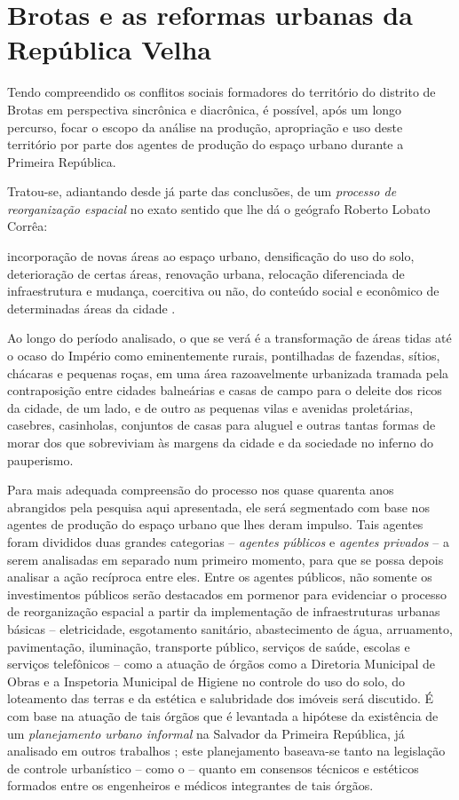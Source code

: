 \chapter{Brotas e as reformas urbanas da República Velha}\label{cap:3}

Tendo compreendido os conflitos sociais formadores do território do distrito de Brotas em perspectiva sincrônica e diacrônica, é possível, após um longo percurso, focar o escopo da análise na produção, apropriação e uso deste território por parte dos agentes de produção do espaço urbano durante a Primeira República. 

Tratou-se, adiantando desde já parte das conclusões, de um \textit{processo de reorganização espacial} no exato sentido que lhe dá o geógrafo Roberto Lobato Corrêa:

\begin{citacao}
incorporação de novas áreas ao espaço urbano, densificação do uso do solo, deterioração de certas áreas, renovação urbana, relocação diferenciada de infraestrutura e mudança, coercitiva ou não, do conteúdo social e econômico de determinadas áreas da cidade \cite[p.~7]{CORREA1985espa}.
\end{citacao}

Ao longo do período analisado, o que se verá é a transformação de áreas tidas até o ocaso do Império como eminentemente rurais, pontilhadas de fazendas, sítios, chácaras e pequenas roças, em uma área razoavelmente urbanizada tramada pela contraposição entre cidades balneárias e casas de campo para o deleite dos ricos da cidade, de um lado, e de outro as pequenas vilas e avenidas proletárias, casebres, casinholas, conjuntos de casas para aluguel e outras tantas formas de morar dos que sobreviviam às margens da cidade e da sociedade no inferno do pauperismo.

Para mais adequada compreensão do processo nos quase quarenta anos abrangidos pela pesquisa aqui apresentada, ele será segmentado com base nos agentes de produção do espaço urbano que lhes deram impulso. Tais agentes foram divididos duas grandes categorias -- \textit{agentes públicos} e \textit{agentes privados} -- a serem analisadas em separado num primeiro momento, para que se possa depois analisar a ação recíproca entre eles. Entre os agentes públicos, não somente os investimentos públicos serão destacados em pormenor para evidenciar o processo de reorganização espacial a partir da implementação de infraestruturas urbanas básicas -- eletricidade, esgotamento sanitário, abastecimento de água, arruamento, pavimentação, iluminação, transporte público, serviços de saúde, escolas e serviços telefônicos -- como a atuação de órgãos como a Diretoria Municipal de Obras e a Inspetoria Municipal de Higiene no controle do uso do solo, do loteamento das terras e da estética e salubridade dos imóveis será discutido. É com base na atuação de tais órgãos que é levantada a hipótese da existência de um \textit{planejamento urbano informal} na Salvador da Primeira República, já analisado em outros trabalhos \cite{almeida_victoria_1997,almeida_vitrinescomercio_2014}; este planejamento baseava-se tanto na legislação de controle urbanístico -- como o -- quanto em consensos técnicos e estéticos formados entre os engenheiros e médicos integrantes de tais órgãos.

